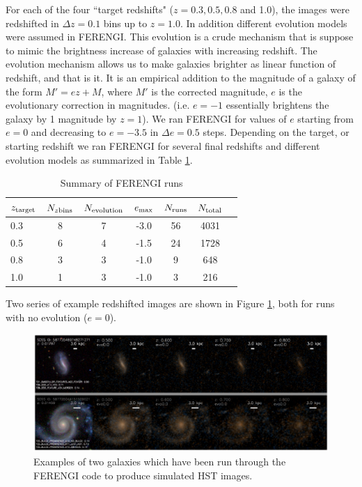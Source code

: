 \documentclass[usenatbib]{mn2e}
\begin{document}
For each of the four ``target redshifts" ($z = 0.3, 0.5, 0.8$ and 1.0), the images were redshifted in $\Delta z = 0.1$ bins up to $z=1.0$. In addition different evolution models were assumed in FERENGI. This evolution is a crude mechanism that is suppose to mimic the brightness increase of galaxies with increasing redshift. The evolution mechanism allows us to make galaxies brighter as linear function of redshift, and that is it. It is an empirical addition to the magnitude of a galaxy of the form $M' = e z + M$, where $M'$ is the corrected magnitude, $e$ is the evolutionary correction in magnitudes.  (i.e. $e=-1$ essentially brightens the galaxy by 1 magnitude by $z=1$). We ran FERENGI for values of $e$ starting from $e=0$ and decreasing to $e=-3.5$ in $\Delta e = 0.5$ steps. Depending on the target, or starting redshift we ran FERENGI for several final redshifts and different evolution models as summarized in Table \ref{ferengi}. 

\begin{table}
\caption{Summary of FERENGI runs \label{ferengi}}
\begin{tabular}{lcccccc}
\hline\hline
$z_{\rm target}$ &  $N_{z {\rm bins}}$ & $N_{\rm evolution}$ & $e_{\rm max}$ & $N_{\rm runs}$ & $N_{\rm total}$\\
\hline
0.3 & 8 & 7 & -3.0 & 56 & 4031 \\
0.5 & 6 & 4 & -1.5 & 24 & 1728 \\
0.8 & 3 & 3 & -1.0 & 9 & 648 \\
1.0 & 1 & 3 & -1.0 & 3 & 216 \\
\hline\hline
\end{tabular}
\end{table}

Two series of example redshifted images are shown in Figure \ref{exampleFERENGI}, both for runs with no evolution ($e=0$). 

\begin{figure}
\includegraphics[width=160mm]{example_ferengi.ps}
\caption{Examples of two galaxies which have been run through the FERENGI code to produce simulated HST images. \label{exampleFERENGI}}
\end{figure}
\end{document}
